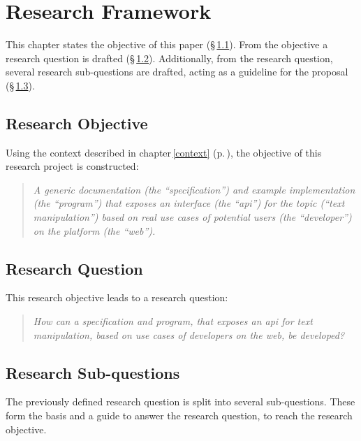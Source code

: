 \chapter{Research Framework}\label{research-framework}

This chapter states the objective of this paper (§\,\ref{research-objective}).
From the objective a research question is drafted
  (§\,\ref{research-question}).
Additionally, from the research question, several research sub-questions are
  drafted, acting as a guideline for the proposal
  (§\,\ref{research-sub-questions}).

\section{Research Objective}\label{research-objective}

Using the context described in chapter\,\ref{context} (p.\,\pageref{context}),
  the objective of this research project is constructed:

\begin{quote}
  \textit{A generic documentation (the ``specification'') and example
    implementation (the ``program'') that exposes an interface (the
    ``\acrshort{api}'') for the topic (``text manipulation'') based on real
    use cases of potential users (the ``developer'') on the platform (the
    ``web'').
  }
\end{quote}

\section{Research Question}\label{research-question}

This research objective leads to a research question:

\begin{quote}
  \textit{How can a specification and program, that exposes an \acrshort{api}
    for text manipulation, based on use cases of developers on the web,
    be developed?
  }
\end{quote}

\section{Research Sub-questions}\label{research-sub-questions}

The previously defined research question is split into several sub-questions.
These form the basis and a guide to answer the research question, to reach
  the research objective.

